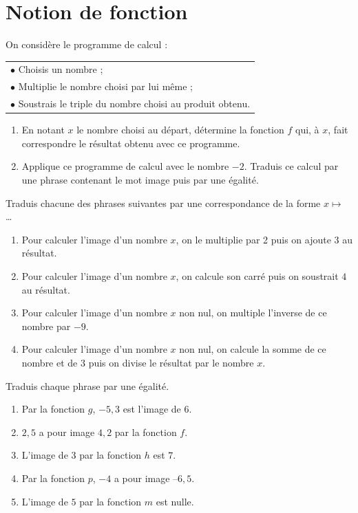 \documentclass[a4paper,10pt]{report}
\begin{document}
\pagestyle{empty}
\newpage
\section*{Notion de fonction}

\begin{ex}
On considère le programme de calcul :

\renewcommand{\arraystretch}{1.5}
\begin{tabularx}{10cm}{|X|}
\hline
$\bullet$ Choisis un nombre ;\\
$\bullet$ Multiplie le nombre choisi par lui même ;\\
$\bullet$ Soustrais le triple du nombre choisi au produit obtenu.\\\hline
\end{tabularx}

\begin{enumerate}[font=\color{exer1}]
\item En notant $x$ le nombre choisi au départ, détermine la fonction $f$ qui, à $x$, fait correspondre le résultat obtenu avec ce programme.
\item Applique ce programme de calcul avec le nombre $-2$. Traduis ce calcul par une phrase contenant le mot \og image \fg{} puis par une égalité.
\end{enumerate}
\end{ex}

\begin{ex}
Traduis chacune des phrases suivantes par une correspondance de la forme $x \mapsto$ \dots
\begin{enumerate}[font=\color{exer1}]
\item Pour calculer l'image d'un nombre $x$, on le multiplie par 2 puis on ajoute $3$ au résultat.
\item Pour calculer l'image d'un nombre $x$, on calcule son carré puis on soustrait $4$ au résultat.
\item Pour calculer l'image d'un nombre $x$ non nul, on multiple l'inverse de ce nombre par $-9$.
\item Pour calculer l'image d'un nombre $x$ non nul, on calcule la somme de ce nombre et de $3$ puis on divise le résultat par le nombre $x$.
\end{enumerate}
\end{ex}

\begin{ex}
Traduis chaque phrase par une égalité.
\begin{enumerate}[font=\color{exer1}]
\item Par la fonction $g$, $-5,3$ est l'image de $6$.
\item $2,5$ a pour image $4,2$ par la fonction $f$.
\item L'image de $3$ par la fonction $h$ est $7$.
\item Par la fonction $p$, $-4$ a pour image $– 6,5$.
\item L'image de $5$ par la fonction $m$ est nulle.
\end{enumerate}
\end{ex}
\end{document}
